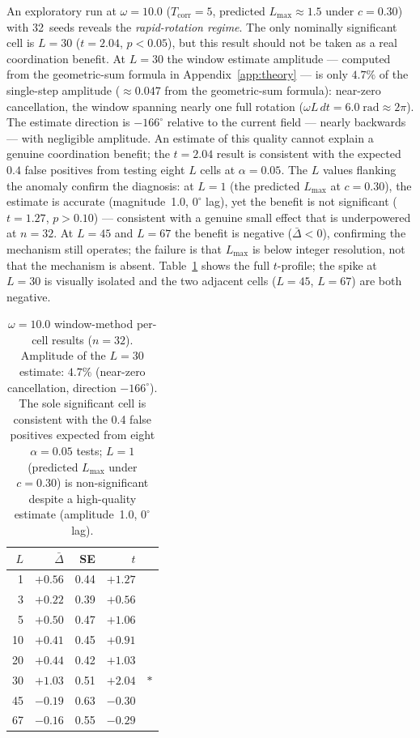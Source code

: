 \documentclass[sigconf,anonymous]{aamas}
\newcommand{\Dbar}{\bar{\Delta}}
\newcommand{\Lmax}{L_{\max}}
\newcommand{\Tcorr}{T_{\mathrm{corr}}}
\begin{document}
An exploratory run at $\omega{=}10.0$ ($\Tcorr{=}5$, predicted
$\Lmax \approx 1.5$ under $c{=}0.30$) with 32~seeds reveals the
\emph{rapid-rotation regime}.  The only nominally significant cell
is $L{=}30$ ($t{=}2.04$, $p{<}0.05$), but this result should not
be taken as a real coordination benefit.  At $L{=}30$ the window
estimate amplitude — computed from the geometric-sum formula in
Appendix~\ref{app:theory} — is only $4.7\%$ of the single-step
amplitude ($\approx 0.047$ from the geometric-sum formula):
near-zero cancellation, the window spanning nearly one full
rotation ($\omega L\,dt{=}6.0\;\text{rad} \approx 2\pi$).  The estimate direction is $-166^\circ$
relative to the current field — nearly backwards — with
negligible amplitude.  An estimate of this quality cannot explain
a genuine coordination benefit; the $t{=}2.04$ result is consistent
with the expected $0.4$ false positives from testing eight $L$
cells at $\alpha{=}0.05$.
The $L$ values flanking the anomaly confirm the diagnosis:
at $L{=}1$ (the predicted $\Lmax$ at $c{=}0.30$), the estimate
is accurate (magnitude~1.0, $0^\circ$ lag), yet the benefit is
not significant ($t{=}1.27$, $p{>}0.10$) — consistent with a
genuine small effect that is underpowered at $n{=}32$.
At $L{=}45$ and $L{=}67$ the benefit is negative ($\Dbar < 0$),
confirming the mechanism still operates; the failure is that
$\Lmax$ is below integer resolution, not that the mechanism is
absent.
Table~\ref{tab:omega10} shows the full $t$-profile; the spike at
$L{=}30$ is visually isolated and the two adjacent cells
($L{=}45$, $L{=}67$) are both negative.

\begin{table}[h]
\centering
\caption{$\omega{=}10.0$ window-method per-cell results ($n{=}32$).
  Amplitude of the $L{=}30$ estimate: $4.7\%$ (near-zero cancellation,
  direction $-166^\circ$).  The sole significant cell is consistent
  with the 0.4 false positives expected from eight $\alpha{=}0.05$
  tests; $L{=}1$ (predicted $\Lmax$ under $c{=}0.30$) is
  non-significant despite a high-quality estimate (amplitude~1.0,
  $0^\circ$ lag).}
\label{tab:omega10}
\setlength\tabcolsep{4pt}
{\small
\begin{tabular}{rrrrl}
\toprule
$L$ & $\Dbar$ & SE & $t$ & \\
\midrule
 1  & $+0.56$ & 0.44 & $+1.27$ & \\
 3  & $+0.22$ & 0.39 & $+0.56$ & \\
 5  & $+0.50$ & 0.47 & $+1.06$ & \\
10  & $+0.41$ & 0.45 & $+0.91$ & \\
20  & $+0.44$ & 0.42 & $+1.03$ & \\
30  & $+1.03$ & 0.51 & $+2.04$ & $*$ \\
45  & $-0.19$ & 0.63 & $-0.30$ & \\
67  & $-0.16$ & 0.55 & $-0.29$ & \\
\bottomrule
\end{tabular}
}
\end{table}
\end{document}
